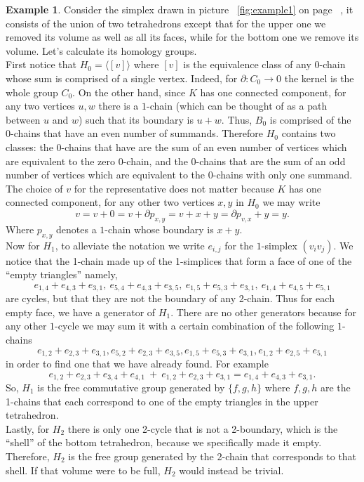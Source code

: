 \documentclass{article}
\theoremstyle{plain}
\theoremstyle{definition}
\newtheorem{example}{Example}[section]
\theoremstyle{remark}
\begin{document}
\begin{example}
Consider the simplex drawn in picture ~\ref{fig:example1} on page ~\pageref{fig:example1}, it consists of the union of two tetrahedrons except that for the upper one we removed its volume as well as all its faces, while for the bottom one we remove its volume.
Let’s calculate its homology groups. \\ First notice that $H_0 = \langle [v] \rangle $ where $[v]$ is the equivalence class of any $0$-chain whose sum is comprised of a single vertex. Indeed, for $\partial: C_0 \to 0$ the kernel is the whole group $C_0$. On the other hand, since $K$ has one connected component, for any two vertices $u,w$ there is a $1$-chain (which can be thought of as a path between $u$ and $w$) such that its boundary is $u+w$. Thus, $B_0$ is comprised of the $0$-chains that have an even number of summands. Therefore $H_0$ contains two classes: the $0$-chains that have are the sum of an even number of vertices which are equivalent to the zero $0$-chain, and the $0$-chains that are the sum of an odd number of vertices which are equivalent to the $0$-chains with only one summand. The choice of $v$ for the representative does not matter because $K$ has one connected component, for any other two vertices $x,y$ in $H_0$ we may write 
\[v = v+0 = v + \partial p_{x,y} = v + x + y = \partial p_{v,x} + y = y.  \] Where $p_{x,y}$ denotes a $1$-chain whose boundary is $x+y$. \\
Now for $H_1$, to alleviate the notation we write $e_{i,j}$ for the $1$-simplex $(v_iv_j)$. We notice that the 1-chain made up of the 1-simplices that form a face of one of the “empty triangles” namely, \[ e_{1,4} + e_{4,3} + e_{3,1},\ e_{5,4} + e_{4,3} + e_{3,5},\ e_{1,5} + e_{5,3} + e_{3,1},\ e_{1,4} + e_{4,5} + e_{5,1} \] are cycles, but that they are not the boundary of any 2-chain. Thus for each empty face, we have a generator of $H_1$. There are no other generators because for any other $1$-cycle we may sum it with a certain combination of the following $1$-chains \[ e_{1,2} + e_{2,3} + e_{3,1}, e_{5,2} + e_{2,3} + e_{3,5}, e_{1,5} + e_{5,3} + e_{3,1}, e_{1,2} + e_{2,5} + e_{5,1} \]  in order to find one that we have already found. For example
\[ e_{1,2} + e_{2,3} + e_{3,4} + e_{4,1} \ + \ e_{1,2} + e_{2,3} + e_{3,1} = e_{1,4} + e_{4,3} + e_{3,1} .\] So, $H_1$ is the free commutative group generated by $\{f,g,h\}$ where $f,g,h$ are the 1-chains that each correspond to one of the empty triangles in the upper tetrahedron. \\
Lastly, for $H_2$ there is only one 2-cycle that is not a 2-boundary, which is the “shell” of the bottom tetrahedron, because we specifically made it empty. Therefore, $H_2$ is the free group generated by the 2-chain that corresponds to that shell. If that volume were to be full, $H_2$ would instead be trivial.\\

\end{example}
\end{document}
